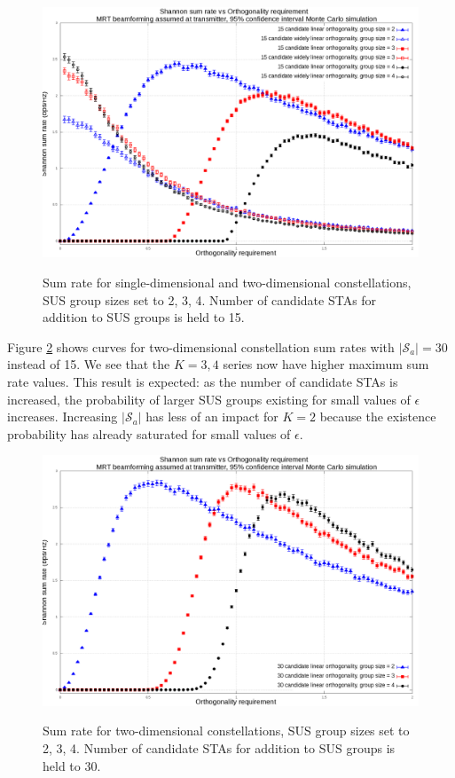 \begin{figure}
    \centering
    \includegraphics[width=24cm]{figs/15_candidate_mrt.png}\\
    \caption{Sum rate for single-dimensional and two-dimensional constellations, SUS group sizes set to 2, 3, 4. Number of candidate STAs for addition to SUS groups is held to 15.}
    \label{fig:15_candidate}
\end{figure}

Figure \ref{fig:30_candidate} shows  curves for two-dimensional constellation sum rates with $\vert \mathcal{S}_a \vert = 30$ instead of 15. We see that the $K=3,4$ series now have higher maximum sum rate values. This result is expected: as the number of candidate STAs is increased, the probability of larger SUS groups existing for small values of $\epsilon$ increases. Increasing $\vert \mathcal{S}_a \vert$ has less of an impact for $K=2$ because the existence probability has already saturated for small values of $\epsilon$.
\begin{figure}
    \centering
    \includegraphics[width=24cm]{figs/30_candidate_mrt.png}\\
    \caption{Sum rate for two-dimensional constellations, SUS group sizes set to 2, 3, 4. Number of candidate STAs for addition to SUS groups is held to 30.}
    \label{fig:30_candidate}
\end{figure}